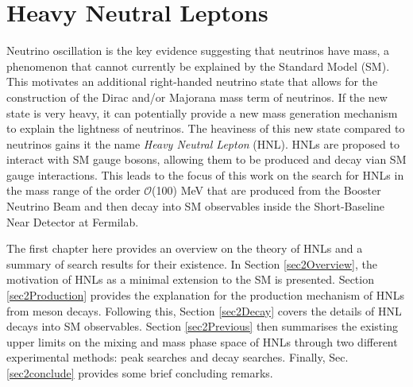 
\chapter{Heavy Neutral Leptons}
\label{ChapterHNL}

\ifpdf
    \graphicspath{{Chapter2/Figs/Raster/}{Chapter2/Figs/PDF/}{Chapter2/Figs/}}
\else
    \graphicspath{{Chapter2/Figs/Vector/}{Chapter2/Figs/}}
\fi


Neutrino oscillation is the key evidence suggesting that neutrinos have mass, a phenomenon that cannot currently be explained by the Standard Model (SM).
This motivates an additional right-handed neutrino state that allows for the construction of the Dirac and/or Majorana mass term of neutrinos.
If the new state is very heavy, it can potentially provide a new mass generation mechanism to explain the lightness of neutrinos.
The heaviness of this new state compared to neutrinos gains it the name \textit{Heavy Neutral Lepton} (HNL).
HNLs are proposed to interact with SM gauge bosons, allowing them to be produced and decay vian SM gauge interactions.
This leads to the focus of this work on the search for HNLs in the mass range of the order $\mathcal{O}$(100) MeV that are produced from the Booster Neutrino Beam and then decay into SM observables inside the Short-Baseline Near Detector at Fermilab.

The first chapter here provides an overview on the theory of HNLs and a summary of search results for their existence.  
In Section \ref{sec2Overview}, the motivation of HNLs as a minimal extension to the SM is presented.
Section \ref{sec2Production} provides the explanation for the production mechanism of HNLs from meson decays.
Following this, Section \ref{sec2Decay} covers the details of HNL decays into SM observables. 
Section \ref{sec2Previous} then summarises the existing upper limits on the mixing and mass phase space of HNLs through two different experimental methods: peak searches and decay searches.
Finally, Sec. \ref{sec2conclude} provides some brief concluding remarks.

\newpage
